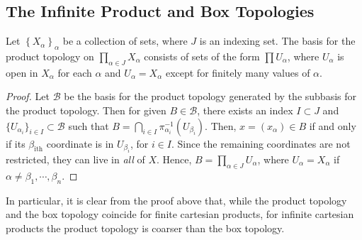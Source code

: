 \subsection{The Infinite Product and Box Topologies}
\begin{theorem}
\label{thm:prod-topo-inf-basis}
Let \(\left\{ X_{\alpha} \right\}_{\alpha}\) be a collection of sets, where
\(J\) is an indexing set. The
basis for the product topology on \(\prod_{\alpha \in J} X_{\alpha}\)
consists of sets of the form \(\prod U_{\alpha}\), where \(U_{\alpha}\)
is open in \(X_{\alpha}\) for each \(\alpha\) and \(U_{\alpha} =
X_{\alpha}\) except for finitely many values of \(\alpha\).
\end{theorem}
\begin{proof}
Let \(\mathcal{B}\) be the basis for the product topology generated by the
subbasis for the product topology. Then for given \(B \in \mathcal{B}\), there
exists an index \(I \subset J\) and  \(\{U_{\alpha_{i}}\}_{i \in I} \subset
\mathcal{B}\) such that
\(B = \bigcap_{i \in I}\pi_{\alpha_{i}}^{-1}(U_{\beta_{i}})\). Then, \(x = (x_{\alpha}) \in B\)
if and only if its \(\beta_{\text{ith}}\) coordinate is in \(U_{\beta_{i}}\), for
\(i \in I\). Since the remaining coordinates are not restricted, they
can live in \emph{all} of \(X\). Hence,
\(B = \prod_{\alpha \in J} U_{\alpha}\), where \(U_{\alpha} = X_{\alpha}\)
if \(\alpha \neq \beta_{1}, \cdots, \beta_{n}\).
\end{proof}
\begin{remark}
\label{rem:prod-top-coarser-box}
In particular, it is clear from the proof above that, while the product
topology and the box topology coincide for finite cartesian products, for
infinite cartesian products the product topology is coarser than the box
topology.
\end{remark}
